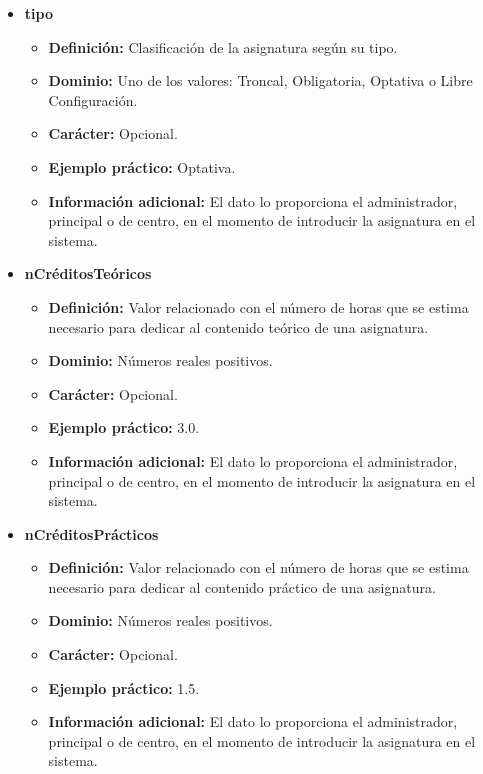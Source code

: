 \begin{description}
\begin{itemize}
\begin{itemize}
      \end{itemize}
   \item \textbf{tipo}
      \begin{itemize}
         \item \textbf{Definición:} Clasificación de la asignatura según su tipo.
         \item \textbf{Dominio:} Uno de los valores: Troncal, Obligatoria, Optativa o Libre Configuración.
         \item \textbf{Carácter:}  Opcional.
         \item \textbf{Ejemplo práctico:} Optativa.
         \item \textbf{Información adicional:} El dato lo proporciona el administrador, principal o de
         centro, en el momento de introducir la asignatura en el sistema.
      \end{itemize}
   \item \textbf{nCréditosTeóricos}
      \begin{itemize}
         \item \textbf{Definición:} Valor relacionado con el número de horas que se estima necesario para dedicar al contenido teórico de una asignatura.
         \item \textbf{Dominio:} Números reales positivos.
         \item \textbf{Carácter:}  Opcional.
         \item \textbf{Ejemplo práctico:} 3.0.
         \item \textbf{Información adicional:} El dato lo proporciona el administrador, principal o de
         centro, en el momento de introducir la asignatura en el sistema.
      \end{itemize}
   \item \textbf{nCréditosPrácticos}
      \begin{itemize}
         \item \textbf{Definición:} Valor relacionado con el número de horas que se estima necesario para dedicar al contenido práctico de una asignatura.
         \item \textbf{Dominio:} Números reales positivos.
         \item \textbf{Carácter:}  Opcional.
         \item \textbf{Ejemplo práctico:} 1.5.
         \item \textbf{Información adicional:} El dato lo proporciona el administrador, principal o de
         centro, en el momento de introducir la asignatura en el sistema.
      \end{itemize}


\end{itemize}
\end{description}
